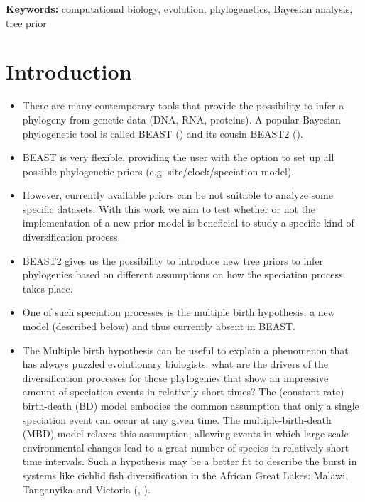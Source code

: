 \documentclass{article}
\begin{document}
{\bf Keywords:} computational biology, evolution, phylogenetics, Bayesian analysis, tree prior

\section{Introduction}
\begin{itemize}

\item There are many contemporary tools that provide the possibility 
to infer a phylogeny from genetic data (DNA, RNA, proteins). 
A popular Bayesian phylogenetic tool is called BEAST (\cite{beast}) 
and its cousin BEAST2 (\cite{beast2}).

\item BEAST is very flexible, providing the user with the option 
to set up all possible phylogenetic priors (e.g. site/clock/speciation model).

\item However, currently available priors can be not suitable 
to analyze some specific datasets. 
With this work we aim to test whether or not 
the implementation of a new prior model 
is beneficial to study a specific kind of diversification process.

\item BEAST2 gives us the possibility to introduce new tree priors 
to infer phylogenies based on different assumptions 
on how the speciation process takes place.

\item One of such speciation processes is the multiple birth hypothesis,
a new model (described below) and thus currently absent in BEAST.

\item The Multiple birth hypothesis can be useful to explain a phenomenon 
that has always puzzled evolutionary biologists: 
what are the drivers of the diversification processes 
for those phylogenies that show an impressive amount of speciation events 
in relatively short times? 
The (constant-rate) birth-death (BD) model embodies the common assumption that 
only a single speciation event can occur at any given time.
The multiple-birth-death (MBD) model 
relaxes this assumption, allowing events in which 
large-scale environmental changes lead to a great number of species 
in relatively short time intervals. 
Such a hypothesis may be a better fit to describe the burst in systems 
like cichlid fish diversification in the 
African Great Lakes: Malawi, Tanganyika and Victoria 
(\cite{janzen2016}, \cite{janzen2017}).


\end{itemize}
\end{document}
